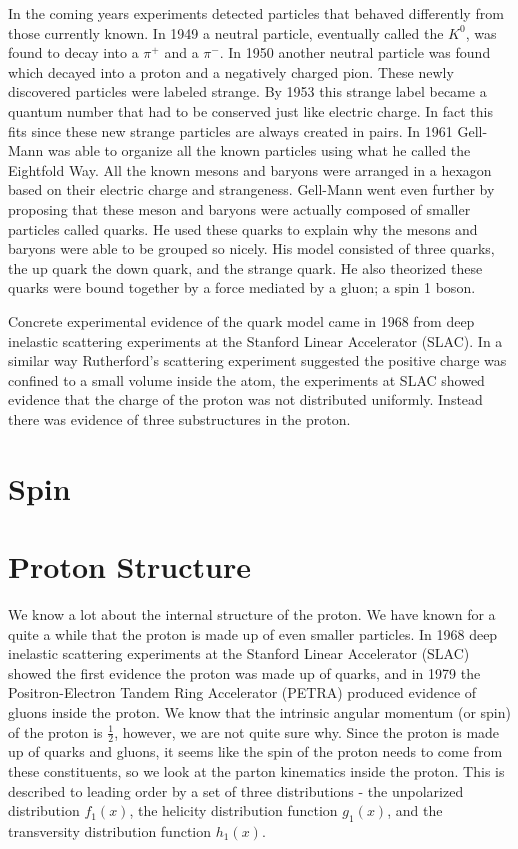 \documentclass[abstract = on,listof=totoc, bibliography=totoc]{scrreprt}
\begin{document}
In the coming years experiments detected particles that behaved differently from those currently known. In 1949 a neutral particle, eventually called the $K^0$, was found to decay into a $\pi^+$ and a $\pi^-$. In 1950 another neutral particle was found which decayed into a proton and a negatively charged pion. These newly discovered particles were labeled strange. By 1953 this strange label became a quantum number that had to be conserved just like electric charge. In fact this fits since these new strange particles are always created in pairs. In 1961 Gell-Mann was able to organize all the known particles using what he called the Eightfold Way. All the known mesons and baryons were arranged in a hexagon based on their electric charge and strangeness.  Gell-Mann went even further by proposing that these meson and baryons were actually composed of smaller particles called quarks. He used these quarks to explain why the mesons and baryons were able to be grouped so nicely. His model consisted of three quarks, the up quark the down quark, and the strange quark. He also theorized these quarks were bound together by a force mediated by a gluon; a spin 1 boson. 

Concrete experimental evidence of the quark model came in 1968 from deep inelastic scattering experiments at the Stanford Linear Accelerator (SLAC). In a similar way Rutherford's scattering experiment suggested the positive charge was confined to a small volume inside the atom, the experiments at SLAC showed evidence that the charge of the proton was not distributed uniformly. Instead there was evidence of three substructures in the proton. 




\section{Spin}









\section{Proton Structure}



We know a lot about the internal structure of the proton. We have known for a quite a while that the proton is made up of even smaller particles. In 1968 deep inelastic scattering experiments at the Stanford Linear Accelerator (SLAC) showed the first evidence the proton was made up of quarks, and in 1979 the Positron-Electron Tandem Ring Accelerator (PETRA) produced evidence of gluons inside the proton. We know that the intrinsic angular momentum (or spin) of the proton is $\frac{1}{2}$, however, we are not quite sure why. Since the proton is made up of quarks and gluons, it seems like the spin of the proton needs to come from these constituents, so we look at the parton kinematics inside the proton. This is described to leading order by a set of three distributions -  the unpolarized distribution $f_1(x)$, the helicity distribution function $g_1(x)$, and the transversity distribution function $h_1(x)$.            
\end{document}
